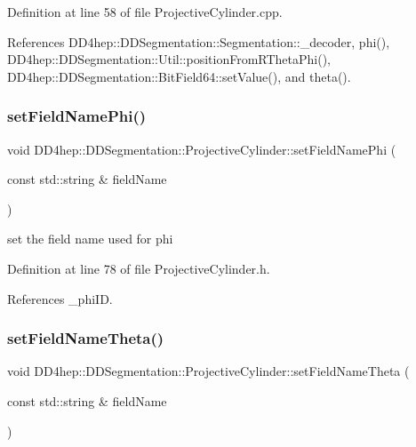 Definition at line 58 of file Projective\+Cylinder.\+cpp.



References D\+D4hep\+::\+D\+D\+Segmentation\+::\+Segmentation\+::\+\_\+decoder, phi(), D\+D4hep\+::\+D\+D\+Segmentation\+::\+Util\+::position\+From\+R\+Theta\+Phi(), D\+D4hep\+::\+D\+D\+Segmentation\+::\+Bit\+Field64\+::set\+Value(), and theta().

\hypertarget{class_d_d4hep_1_1_d_d_segmentation_1_1_projective_cylinder_ad43fb9ac8d2eb280bdeb465f46f49c28}{}\label{class_d_d4hep_1_1_d_d_segmentation_1_1_projective_cylinder_ad43fb9ac8d2eb280bdeb465f46f49c28} 
\subsubsection{\texorpdfstring{set\+Field\+Name\+Phi()}{setFieldNamePhi()}}
{\footnotesize\ttfamily void D\+D4hep\+::\+D\+D\+Segmentation\+::\+Projective\+Cylinder\+::set\+Field\+Name\+Phi (\begin{DoxyParamCaption}\item[{const std\+::string \&}]{field\+Name }\end{DoxyParamCaption})\hspace{0.3cm}{\ttfamily [inline]}}



set the field name used for phi 



Definition at line 78 of file Projective\+Cylinder.\+h.



References \+\_\+phi\+ID.

\hypertarget{class_d_d4hep_1_1_d_d_segmentation_1_1_projective_cylinder_a90249eda202e3bd1fb2c5d8c193549af}{}\label{class_d_d4hep_1_1_d_d_segmentation_1_1_projective_cylinder_a90249eda202e3bd1fb2c5d8c193549af} 
\subsubsection{\texorpdfstring{set\+Field\+Name\+Theta()}{setFieldNameTheta()}}
{\footnotesize\ttfamily void D\+D4hep\+::\+D\+D\+Segmentation\+::\+Projective\+Cylinder\+::set\+Field\+Name\+Theta (\begin{DoxyParamCaption}\item[{const std\+::string \&}]{field\+Name }\end{DoxyParamCaption})\hspace{0.3cm}{\ttfamily [inline]}}



